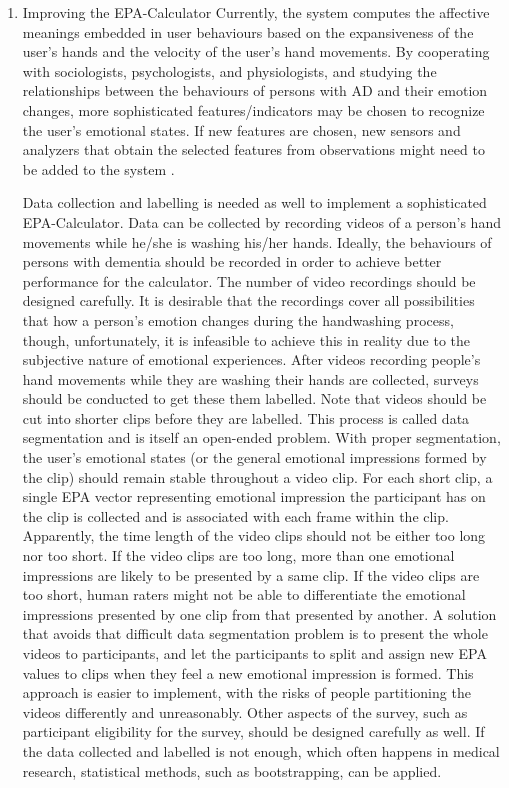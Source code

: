 \begin{enumerate}

\item{Improving the EPA-Calculator}
Currently, the system computes the affective meanings embedded in user behaviours based on the expansiveness of the user's hands and the velocity of the user's hand movements. By cooperating with sociologists, psychologists, and physiologists, and studying the relationships between the behaviours of persons with AD and their emotion changes, more sophisticated features/indicators may be chosen to recognize the user's emotional states. If new features are chosen, new sensors and analyzers that obtain the selected features from observations might need to be added to the system .

Data collection and labelling is needed as well to implement a sophisticated EPA-Calculator. Data can be collected by recording videos of a person's hand movements while he/she is washing his/her hands. Ideally, the behaviours of persons with dementia should be recorded in order to achieve better performance for the calculator. The number of video recordings should be designed carefully. It is desirable that the recordings cover all possibilities that how a person's emotion changes during the handwashing process, though, unfortunately, it is infeasible to achieve this in reality due to the subjective nature of emotional experiences. After videos recording people's hand movements while they are washing their hands are collected, surveys should be conducted to get these them labelled. Note that videos should be cut into shorter clips before they are labelled. This process is called data segmentation and is itself an open-ended problem. With proper segmentation, the user's emotional states (or the general emotional impressions formed by the clip) should remain stable throughout a video clip. For each short clip, a single EPA vector representing emotional impression the participant has on the clip is collected and is associated with each frame within the clip. Apparently, the time length of the video clips should not be either too long nor too short. If the video clips are too long, more than one emotional impressions are likely to be presented by a same clip. If the video clips are too short, human raters might not be able to differentiate the emotional impressions presented by one clip from that presented by another. A solution that avoids that difficult data segmentation problem is to present the whole videos to participants, and let the participants to split and assign new EPA values to clips when they feel a new emotional impression is formed. This approach is easier to implement, with the risks of people partitioning the videos differently and unreasonably. Other aspects of the survey, such as participant eligibility for the survey, should be designed carefully as well. If the data collected and labelled is not enough, which often happens in medical research, statistical methods, such as bootstrapping, can be applied. 


\end{enumerate}
